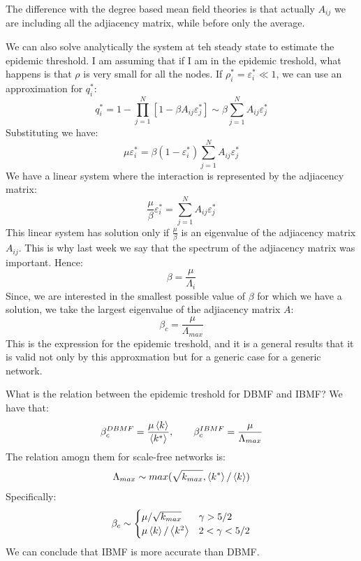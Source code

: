 \documentclass[../main/main.tex]{subfiles}
\begin{document}
The difference with the degree based mean field theories is that actually \( A_{ij} \) we are including all the adjiacency matrix, while before only the average.

We can also solve analytically the system at teh steady state to estimate the epidemic threshold.
I am assuming that if I am in the epidemic treshold, what happens is that \( \rho  \) is very small for all the nodes. If \( \rho _i^* = \varepsilon _i^* \ll 1 \), we can use an approximation for \( q_i^* \):
\begin{equation*}
  q_i^* = 1 - \prod_{j=1}^{N} [1- \beta A_{ij} \varepsilon _j^*] \sim \beta \sum_{j=1}^{N} A_{ij} \varepsilon _j^*
\end{equation*}
Substituting we have:
\begin{equation*}
  \mu \varepsilon _i^* = \beta (1- \varepsilon _i^*) \sum_{j=1}^{N} A_{ij} \varepsilon _{j}^*
\end{equation*}
We have a linear system where the interaction is represented by the adjiacency matrix:
\begin{equation*}
  \frac{\mu }{\beta } \varepsilon _i^* = \sum_{j=1}^{N} A_{ij} \varepsilon _j^*
\end{equation*}
This linear system has solution only if \( \frac{\mu }{\beta } \) is an eigenvalue of the adjiacency matrix \( A_{ij} \). This is why last week we say that the spectrum of the adjiacency matrix was important.
Hence:
\begin{equation*}
  \beta = \frac{\mu }{\Lambda _i}
\end{equation*}
Since, we are interested in the smallest possible value of \( \beta  \) for which we have a solution, we take the largest eigenvalue of the adjiacency matrix \( A \):
\begin{equation*}
  \beta _c = \frac{\mu }{\Lambda _{max}}
\end{equation*}
This is the expression for the epidemic treshold, and it is a general results that it is valid not only by this approxmation but for a generic case for a generic network.

What is the relation between the epidemic treshold for DBMF and IBMF?
We have that:
\begin{equation*}
  \beta _c^{DBMF} = \frac{\mu \expval{k} }{\expval{k^*} }, \qquad \beta _c^{IBMF} = \frac{\mu }{\Lambda _{max}}
\end{equation*}
The relation amogn them for scale-free networks is:
\begin{equation*}
  \Lambda _{max} \sim max(\sqrt{k_{max}}, \expval{k^*}/\expval{k}   )
\end{equation*}
Specifically:
\begin{equation*}
\beta _c \sim
  \begin{cases}
   \mu / \sqrt{k_{max}} & \gamma > 5/2  \\
   \mu \expval{k}/\expval{k^2} & 2 < \gamma < 5/2
  \end{cases}
\end{equation*}
We can conclude that IBMF is more accurate than DBMF.
\end{document}

